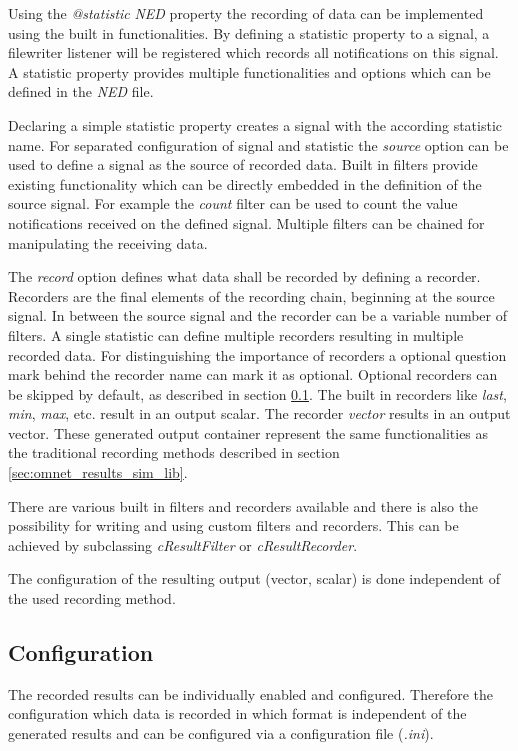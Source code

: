 Using the \emph{@statistic} \emph{NED} property the recording of data can be implemented using the built in functionalities.
By defining a statistic property to a signal, a filewriter listener will be registered which records all notifications on this signal.
A statistic property provides multiple functionalities and options which can be defined in the \emph{NED} file.

Declaring a simple statistic property creates a signal with the according statistic name.
For separated configuration of signal and statistic the \emph{source} option can be used to define a signal as the source of recorded data.
Built in filters provide existing functionality which can be directly embedded in the definition of the source signal.
For example the \emph{count} filter can be used to count the value notifications received on the defined signal.
Multiple filters can be chained for manipulating the receiving data.

The \emph{record} option defines what data shall be recorded by defining a recorder.
Recorders are the final elements of the recording chain, beginning at the source signal.
In between the source signal and the recorder can be a variable number of filters.
A single statistic can define multiple recorders resulting in multiple recorded data.
For distinguishing the importance of recorders a optional question mark behind the recorder name can mark it as optional.
Optional recorders can be skipped by default, as described in section \ref{sec:omnet_results_config}.
The built in recorders like \emph{last}, \emph{min}, \emph{max}, etc. result in an output scalar.
The recorder \emph{vector} results in an output vector.
These generated output container represent the same functionalities as the traditional recording methods described in section \ref{sec:omnet_results_sim_lib}.

There are various built in filters and recorders available \cite[section 4.15.2]{omnet_manual} and there is also the possibility for writing and using custom filters and recorders. 
This can be achieved by subclassing \emph{cResultFilter} or \emph{cResultRecorder}. \cite[section 4.15.6]{omnet_manual}

The configuration of the resulting output (vector, scalar) is done independent of the used recording method.

\subsection{Configuration}
\label{sec:omnet_results_config}
The recorded results can be individually enabled and configured.
Therefore the configuration which data is recorded in which format is independent of the generated results and can be configured via a configuration file (\emph{.ini}).

